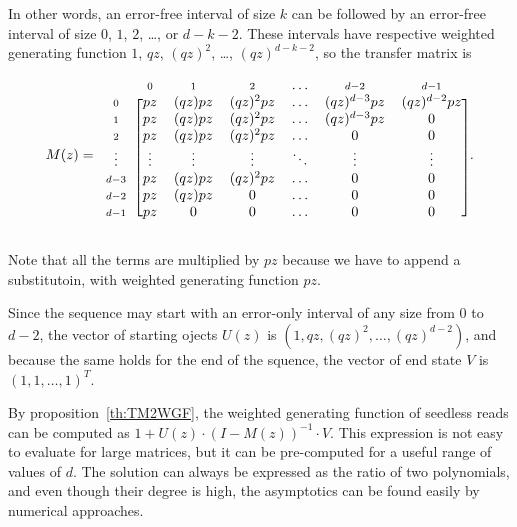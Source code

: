 \documentclass{article}
\begin{document}
In other words, an error-free interval of size $k$ can be followed by an
error-free interval of size $0$, $1$, $2$, \ldots, or $d-k-2$. These
intervals have respective weighted generating function $1$, $qz$,
$(qz)^2$, \ldots, $(qz)^{d-k-2}$, so the transfer matrix is

\begin{equation*}
M(z) = 
\begin{blockarray}{ccccccc}
       & \scriptstyle{0} & \scriptstyle{1} & \scriptstyle{2} &
    \ldots &  \scriptstyle{d-2} & \scriptstyle{d-1} \\
\begin{block}{c[cccccc]}
\scriptstyle{0} & pz  & (qz)pz & (qz)^2pz & \ldots &
    (qz)^{d-3}pz & (qz)^{d-2}pz \\
\scriptstyle{1} & pz  & (qz)pz & (qz)^2pz & \ldots &
    (qz)^{d-3}pz & 0 \\
\scriptstyle{2} & pz  & (qz)pz & (qz)^2pz & \ldots &
    0 & 0 \\
\vdots & \vdots  & \vdots & \vdots & \ddots & \vdots & \vdots  \\
\scriptstyle{d-3} & pz  & (qz)pz & (qz)^2pz & \ldots & 0 & 0 \\
\scriptstyle{d-2} & pz  & (qz)pz & 0 & \ldots & 0 & 0 \\
\scriptstyle{d-1} & pz  & 0      & 0 & \ldots & 0 & 0 \\
\end{block}
\end{blockarray}.
\end{equation*}


Note that all the terms are multiplied by $pz$ because we have to append
a substitutoin, with weighted generating function $pz$.

Since the sequence may start with an error-only interval of any size from
$0$ to $d-2$, the vector of starting ojects $U(z)$ is $(1, qz, (qz)^2,
\ldots, (qz)^{d-2})$, and because the same holds for the end of the
squence, the vector of end state $V$ is $(1,1, \ldots, 1)^T$.

By proposition~\ref{th:TM2WGF}, the weighted generating function of
seedless reads can be computed as $1+U(z) \cdot (I-M(z))^{-1} \cdot V$.
This expression is not easy to evaluate for large matrices, but it can be
pre-computed for a useful range of values of $d$. The solution can always
be expressed as the ratio of two polynomials, and even though their degree
is high, the asymptotics can be found easily by numerical approaches.
\end{document}
